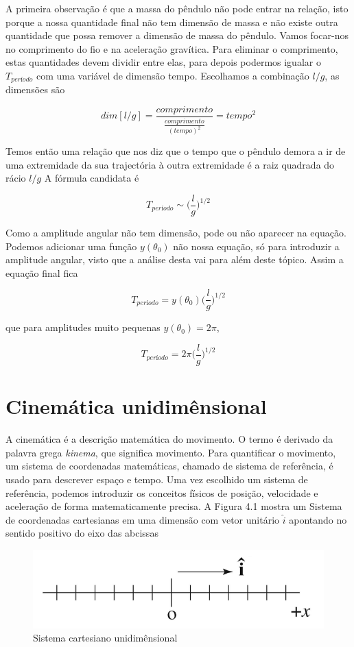 \documentclass[
  portuguese,
  ]{book}
\begin{document}
A primeira observação é que a massa do pêndulo não pode entrar na relação, isto porque a nossa quantidade final não tem dimensão de massa e não existe outra quantidade que possa remover a dimensão de massa do pêndulo. Vamos focar-nos no comprimento do fio e na aceleração gravítica. Para eliminar o comprimento, estas quantidades devem dividir entre elas, para depois podermos igualar o \(T_{período}\) com uma variável de dimensão tempo. Escolhamos a combinação \(l/g\), as dimensões são

\[dim[l/g]=\frac{comprimento}{\frac{comprimento}{(tempo)^2}}=tempo^2\]

Temos então uma relação que nos diz que o tempo que o pêndulo demora a ir de uma extremidade da sua trajectória à outra extremidade é a raiz quadrada do rácio \(l/g\)
A fórmula candidata é

\[T_{período}\sim\Big(\frac{l}{g}\Big)^{1/2}\]

Como a amplitude angular não tem dimensão, pode ou não aparecer na equação. Podemos adicionar uma função \(y(\theta_0)\) não nossa equação, só para introduzir a amplitude angular, visto que a análise desta vai para além deste tópico. Assim a equação final fica

\[T_{período}=y(\theta_0)\Big(\frac{l}{g}\Big)^{1/2}\]

que para amplitudes muito pequenas \(y(\theta_0)=2\pi\),

\[T_{período}=2\pi\Big(\frac{l}{g}\Big)^{1/2}\]

\hypertarget{cinemuxe1tica-unidimuxeansional}{%
\chapter{Cinemática unidimênsional}\label{cinemuxe1tica-unidimuxeansional}}

A cinemática é a descrição matemática do movimento. O termo é derivado da palavra grega \emph{kinema}, que significa movimento. Para quantificar o movimento, um sistema de coordenadas matemáticas, chamado de sistema de referência, é usado para descrever espaço e tempo. Uma vez escolhido um sistema de referência, podemos introduzir os conceitos físicos de posição, velocidade e aceleração de forma matematicamente precisa. A Figura 4.1 mostra um Sistema de coordenadas cartesianas em uma dimensão com vetor unitário \(\widehat{i}\) apontando no sentido positivo do eixo das abcissas

\begin{figure}

{\centering \includegraphics[width=0.6\linewidth]{img/1} 

}

\caption{Sistema cartesiano unidimênsional}\label{fig:img1}
\end{figure}
\end{document}
